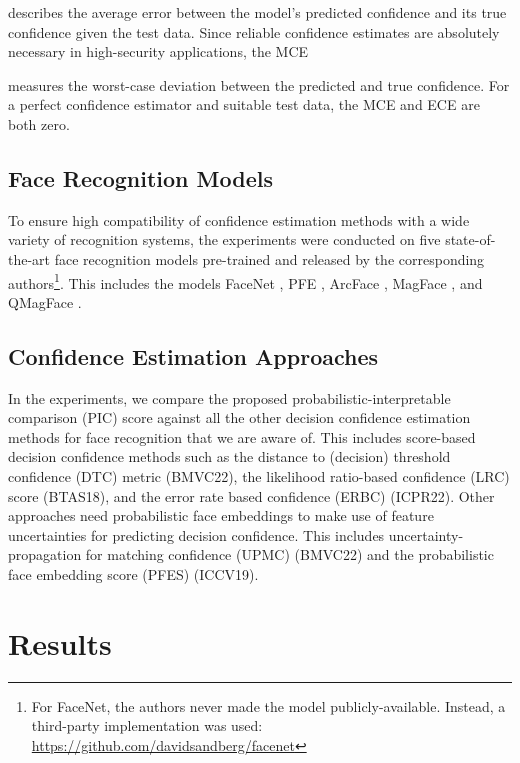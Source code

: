 \documentclass[10pt,twocolumn,letterpaper]{article}
\begin{document}
describes the average error between the model's predicted confidence  and its true confidence  given the test data.
Since reliable confidence estimates are absolutely necessary in high-security applications, the MCE

measures the worst-case deviation between the predicted and true confidence.
For a perfect confidence estimator and suitable test data, the MCE and ECE are both zero. 


\subsection{Face Recognition Models}
To ensure high compatibility of confidence estimation methods with a wide variety of recognition systems, the experiments were conducted on five state-of-the-art face recognition models pre-trained and released by the corresponding authors\footnote{For FaceNet, the authors never made the model publicly-available. Instead, a third-party implementation was used: \url{https://github.com/davidsandberg/facenet}}.
This includes the models FaceNet \cite{DBLP:conf/cvpr/SchroffKP15}, PFE \cite{DBLP:conf/iccv/ShiJ19}, ArcFace \cite{DBLP:conf/cvpr/DengGXZ19}, MagFace \cite{DBLP:conf/cvpr/MengZH021}, and QMagFace \cite{DBLP:journals/corr/abs-2111-13475}.



\subsection{Confidence Estimation Approaches}
In the experiments, we compare the proposed probabilistic-interpretable comparison (PIC) score against all the other decision confidence estimation methods for face recognition that we are aware of.
This includes score-based decision confidence methods such as the distance to (decision) threshold confidence (DTC) metric \cite{DBLP:journals/corr/abs-2210-10354} (BMVC22), the likelihood ratio-based confidence (LRC) score \cite{DBLP:conf/btas/ZeinstraMVS18} (BTAS18), and the error rate based confidence (ERBC) \cite{huberICPR22} (ICPR22).
Other approaches need probabilistic face embeddings to make use of feature uncertainties for predicting decision confidence.
This includes uncertainty-propagation for matching confidence (UPMC) \cite{DBLP:journals/corr/abs-2210-10354} (BMVC22) and the probabilistic face embedding score (PFES) \cite{DBLP:conf/iccv/ShiJ19} (ICCV19).

\section{Results}
\label{sec:Results}
\end{document}
